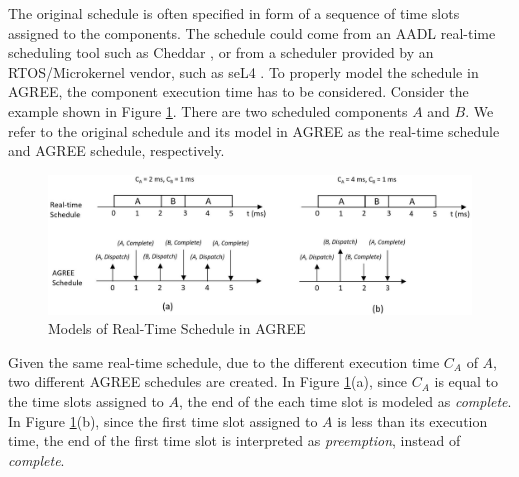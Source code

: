 The original schedule is often specified in form of a sequence of time slots assigned to the components. 
The schedule could come from an AADL real-time scheduling tool such as Cheddar \cite{cheddar}, or from a scheduler provided by an RTOS/Microkernel vendor, such as seL4 \cite{sel4}. 
To properly model the schedule in AGREE, the component execution time has to be considered. Consider the example shown in Figure \ref{RTschedule}. There are two scheduled components $A$ and $B$. We refer to the original schedule and its model in AGREE as the real-time schedule and AGREE schedule, respectively.
\begin{figure}[ht!]
\centering
\includegraphics[width=130mm]{RTschedule.jpg}
\caption{Models of Real-Time Schedule in AGREE\label{RTschedule}}
\end{figure}
Given the same real-time schedule, due to the different execution time $C_A$ of $A$, two different AGREE schedules are created. In Figure \ref{RTschedule}(a), since $C_A$ is equal to the time slots assigned to $A$, the end of the each time slot is modeled as \emph{complete}. In Figure \ref{RTschedule}(b), since the first time slot assigned to $A$ is less than its execution time, the end of the first time slot is interpreted as \emph{preemption}, instead of \emph{complete}.



